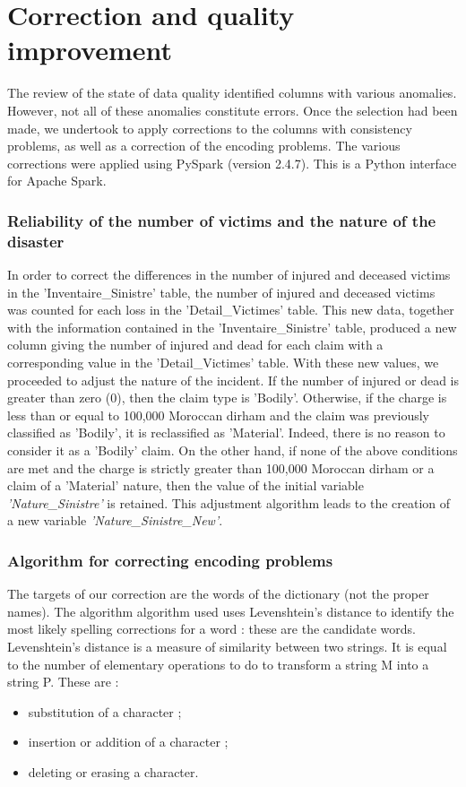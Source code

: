 \section{Correction and quality improvement}
The review of the state of data quality identified columns with various anomalies. However, not all of these anomalies constitute errors. Once the selection had been made, we undertook to apply corrections to the columns with consistency problems, as well as a correction of the encoding problems. The various corrections were applied using PySpark (version 2.4.7). This is a Python interface for Apache Spark. 

\subsubsection{Reliability of the number of victims and the nature of the disaster}
In order to correct the differences in the number of injured and deceased victims in the 'Inventaire\_Sinistre' table, the number of injured and deceased victims was counted for each loss in the 'Detail\_Victimes' table. This new data, together with the information contained in the 'Inventaire\_Sinistre' table, produced a new column giving the number of injured and dead for each claim with a corresponding value in the 'Detail\_Victimes' table. With these new values, we proceeded to adjust the nature of the incident. If the number of injured or dead is greater than zero (0), then the claim type is 'Bodily'. Otherwise, if the charge is less than or equal to 100,000 Moroccan dirham and the claim was previously classified as 'Bodily', it is reclassified as 'Material'. Indeed, there is no reason to consider it as a 'Bodily' claim. On the other hand, if none of the above conditions are met and the charge is strictly greater than 100,000 Moroccan dirham or a claim of a 'Material' nature, then the value of the initial variable \textit{'Nature\_Sinistre'} is retained. This adjustment algorithm leads to the creation of a new variable \textit{'Nature\_Sinistre\_New'}.

\subsubsection{Algorithm for correcting encoding problems}
The targets of our correction are the words of the dictionary (not the proper names). The algorithm algorithm used uses Levenshtein's distance to identify the most likely spelling corrections for a word : these are the candidate words. Levenshtein's distance is a measure of similarity between two strings. It is equal to the number of elementary operations to do to transform a string M into a string P. These are :
\begin{itemize}[parsep=0cm,itemsep=0cm]
    \item substitution of a character ;
    \item insertion or addition of a character ;
    \item deleting or erasing a character.
\end{itemize}

